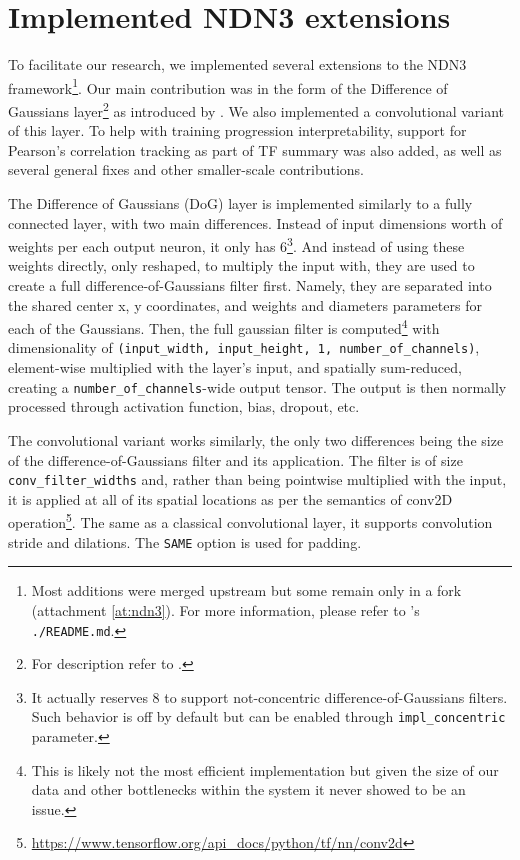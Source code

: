 \section{Implemented NDN3 extensions}\label{ch:3.2}

To facilitate our research, we implemented several extensions to the NDN3 framework\footnote{Most additions were merged upstream but some remain only in a fork (attachment \ref{at:ndn3}). For more information, please refer to 's \texttt{./README.md}.}. Our main contribution was in the form of the Difference of Gaussians layer\footnote{For description refer to .} as introduced by \cite{antolik}. We also implemented a convolutional variant of this layer. To help with training progression interpretability, support for Pearson’s correlation tracking as part of TF summary was also added, as well as several general fixes and other smaller-scale contributions.

The Difference of Gaussians (DoG) layer is implemented similarly to a fully connected layer, with two main differences. Instead of input dimensions worth of weights per each output neuron, it only has 6\footnote{It actually reserves 8 to support not-concentric difference-of-Gaussians filters. Such behavior is off by default but can be enabled through \texttt{impl\_concentric} parameter.}. And instead of using these weights directly, only reshaped, to multiply the input with, they are used to create a full difference-of-Gaussians filter first. Namely, they are separated into the shared center x, y coordinates, and weights and diameters parameters for each of the Gaussians. Then, the full gaussian filter is computed\footnote{This is likely not the most efficient implementation but given the size of our data and other bottlenecks within the system it never showed to be an issue.} with dimensionality of \texttt{(input\_width, input\_height, 1, number\_of\_channels)}, element-wise multiplied with the layer’s input, and spatially sum-reduced, creating a \texttt{number\_of\_channels}-wide output tensor. The output is then normally processed through activation function, bias, dropout, etc.

The convolutional variant works similarly, the only two differences being the size of the difference-of-Gaussians filter and its application. The filter is of size \texttt{conv\_filter\_widths} and, rather than being pointwise multiplied with the input, it is applied at all of its spatial locations as per the semantics of conv2D operation\footnote{\href{https://www.tensorflow.org/api_docs/python/tf/nn/conv2d}{https://www.tensorflow.org/api\_docs/python/tf/nn/conv2d}}. The same as a classical convolutional layer, it supports convolution stride and dilations. The \texttt{SAME} option is used for padding. 

